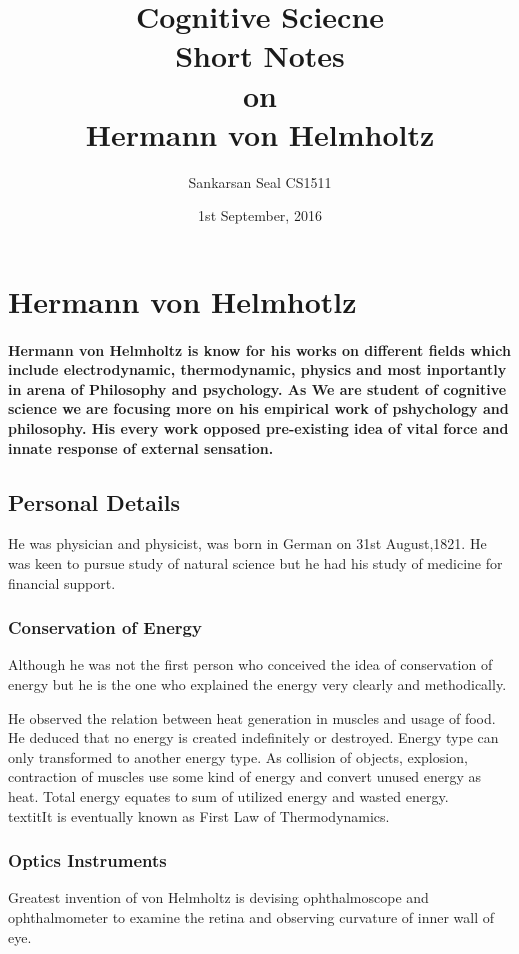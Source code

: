 \documentclass[11pt]{article}
\begin{document}
\title{Cognitive Sciecne\\ Short Notes\\ on\\ Hermann von Helmholtz}
\author{Sankarsan Seal CS1511}
\date{1st September, 2016}
\maketitle

\section{Hermann von Helmhotlz}
\paragraph{Hermann von Helmholtz is know for his works on different fields which include electrodynamic, thermodynamic, physics and most inportantly in arena of Philosophy and psychology. As We are student of cognitive science we are focusing more on his empirical work of pshychology and philosophy. His every work opposed pre-existing idea of vital force and innate response of external sensation.}

\subsection{Personal Details}
He was physician and physicist, was born in German on 31st August,1821. He was keen to pursue study of natural science but he had his study of medicine for financial support.

\subsubsection{Conservation of Energy}
Although he was not the first person who conceived the idea of conservation of energy but he is the one who explained the energy very clearly and methodically.

He observed the relation between heat generation in muscles and  usage of food. He deduced that no energy is created indefinitely or destroyed. Energy type can only transformed to another energy type. As collision of objects, explosion, contraction of muscles use some kind of energy and convert unused energy as heat. Total energy equates to  sum of utilized energy and wasted energy. \\textit{It is eventually known as First Law of Thermodynamics.}

\subsubsection{Optics Instruments}
Greatest invention of von Helmholtz is devising ophthalmoscope and ophthalmometer to examine the retina and observing curvature of inner wall of eye.
\end{document}
